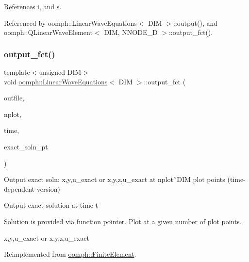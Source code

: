 References i, and s.



Referenced by oomph\+::\+Linear\+Wave\+Equations$<$ D\+I\+M $>$\+::output(), and oomph\+::\+Q\+Linear\+Wave\+Element$<$ D\+I\+M, N\+N\+O\+D\+E\+\_\+D $>$\+::output\+\_\+fct().

\mbox{\label{classoomph_1_1LinearWaveEquations_aa0089c4e106d9bd525639d3215ed6825}} 
\subsubsection{\texorpdfstring{output\+\_\+fct()}{output\_fct()}\hspace{0.1cm}{\footnotesize\ttfamily [2/2]}}
{\footnotesize\ttfamily template$<$unsigned D\+IM$>$ \\
void \hyperlink{classoomph_1_1LinearWaveEquations}{oomph\+::\+Linear\+Wave\+Equations}$<$ D\+IM $>$\+::output\+\_\+fct (\begin{DoxyParamCaption}\item[{std\+::ostream \&}]{outfile,  }\item[{const unsigned \&}]{nplot,  }\item[{const double \&}]{time,  }\item[{\hyperlink{classoomph_1_1FiniteElement_ad4ecf2b61b158a4b4d351a60d23c633e}{Finite\+Element\+::\+Unsteady\+Exact\+Solution\+Fct\+Pt}}]{exact\+\_\+soln\+\_\+pt }\end{DoxyParamCaption})\hspace{0.3cm}{\ttfamily [virtual]}}



Output exact soln\+: x,y,u\+\_\+exact or x,y,z,u\+\_\+exact at nplot$^\wedge$\+D\+IM plot points (time-\/dependent version) 

Output exact solution at time t

Solution is provided via function pointer. Plot at a given number of plot points.

x,y,u\+\_\+exact or x,y,z,u\+\_\+exact 

Reimplemented from \hyperlink{classoomph_1_1FiniteElement_a2a8426dccd57b927be0ae0eec00d0479}{oomph\+::\+Finite\+Element}.




